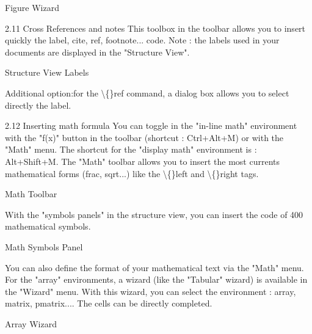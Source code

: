 \documentclass{article}
\begin{document}
	Figure Wizard
	
	2.11 Cross References and notes
	This toolbox in the toolbar allows you to insert quickly the label, cite, ref, footnote... code.
	Note : the labels used in your documents are displayed in the "Structure View".
	
	Structure View Labels
	
	Additional option:for the \textbackslash\{\}ref command, a dialog box allows you to select directly the label.
	
	2.12 Inserting math formula
	You can toggle in the "in-line math" environment with the "f(x)" button in the toolbar (shortcut : Ctrl+Alt+M) or with the "Math" menu. The shortcut for the "display math" environment is : Alt+Shift+M.
	The "Math" toolbar allows you to insert the most currents mathematical forms (frac, sqrt...) like the \textbackslash\{\}left and \textbackslash\{\}right tags.
	
	Math Toolbar
	
	With the "symbols panels" in the structure view, you can insert the code of 400 mathematical symbols.
	
	Math Symbols Panel
	
	You can also define the format of your mathematical text via the "Math" menu.
	For the "array" environments, a wizard (like the "Tabular" wizard) is available in the "Wizard" menu. With this wizard, you can select the environment : array, matrix, pmatrix.... The cells can be directly completed.
	
	Array Wizard
	
\end{document}
